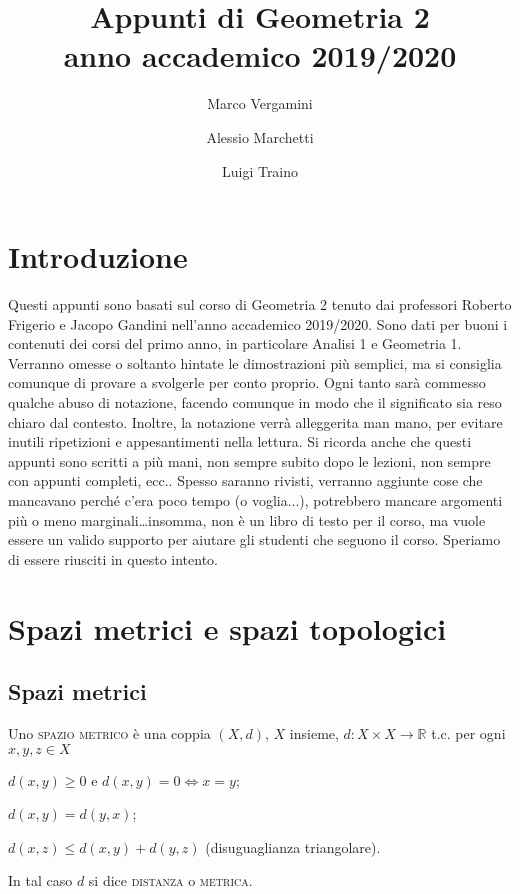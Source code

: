 \documentclass{article}
\title{Appunti di Geometria 2 \\ anno accademico 2019/2020}
\date{}
\author{Marco Vergamini \and Alessio Marchetti \and Luigi Traino}
\begin{document}
\maketitle
\newpage
\tableofcontents
\newpage

\section{Introduzione}
Questi appunti sono basati sul corso di Geometria 2 tenuto dai professori
Roberto Frigerio e Jacopo Gandini nell'anno accademico 2019/2020. Sono dati per
buoni i contenuti dei corsi del primo anno, in particolare Analisi 1 e Geometria
1. Verranno omesse o soltanto hintate le dimostrazioni più semplici, ma si
consiglia comunque di provare a svolgerle per conto proprio. Ogni tanto sarà
commesso qualche abuso di notazione, facendo comunque in modo che il significato
sia reso chiaro dal contesto. Inoltre, la notazione verrà alleggerita man mano,
per evitare inutili ripetizioni e appesantimenti nella lettura. Si ricorda anche
che questi appunti sono scritti a più mani, non sempre subito dopo le lezioni,
non sempre con appunti completi, ecc.. Spesso saranno rivisti, verranno aggiunte
cose che mancavano perché c'era poco tempo (o voglia...), potrebbero mancare
argomenti più o meno marginali\dots insomma, non è un libro di testo per il
corso, ma vuole essere un valido supporto per aiutare gli studenti che seguono
il corso. Speriamo di essere riusciti in questo intento.


\section{Spazi metrici e spazi topologici}
\subsection{Spazi metrici}
\begin{defn}
	Uno \textsc{spazio metrico} è una coppia $(X, d)$, $X$ insieme,
	${d: X \times X \rightarrow \mathbb{R}}$ t.c. per ogni ${x, y, z \in X}$
    \begin{nlist}
    	\item $d(x, y) \ge 0$ e $d(x, y)=0 \Leftrightarrow x=y$;
    	\item $d(x, y)=d(y, x)$;
    	\item $d(x, z) \le d(x, y)+d(y,z)$ (disuguaglianza triangolare).
    \end{nlist}
	In tal caso $d$ si dice \textsc{distanza} o \textsc{metrica}.
\end{defn}
\end{document}
